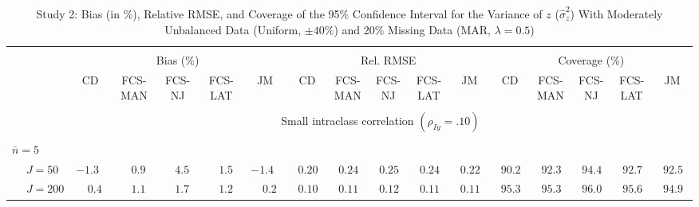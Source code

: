 \begin{sidewaystable}
\begin{threeparttable}
\setlength{\tabcolsep}{1.0pt}
\renewcommand{\arraystretch}{0.95}
\footnotesize
\caption{\small Study 2: Bias (in \%), Relative RMSE, and Coverage of the 95\% Confidence Interval for the Variance of $z$ ($\hat\sigma_z^2$) With Moderately Unbalanced Data (Uniform, $\pm 40\%$) and 20\% Missing Data (MAR, $\lambda=0.5$)}
\begin{tabular}{llccccccccccccccc}
\hline\\[-1.8ex]
& & \multicolumn{5}{c}{Bias (\%)} & \multicolumn{5}{c}{Rel. RMSE} & \multicolumn{5}{c}{Coverage (\%)} \\ \cmidrule(r){3-7}\cmidrule(r){8-12}\cmidrule(r){13-17}
 &  & CD & \makecell{FCS-\\MAN} & \makecell{FCS-\\NJ} & \makecell{FCS-\\LAT} & JM & CD & \makecell{FCS-\\MAN} & \makecell{FCS-\\NJ} & \makecell{FCS-\\LAT} & JM & CD & \makecell{FCS-\\MAN} & \makecell{FCS-\\NJ} & \makecell{FCS-\\LAT} & \multicolumn{1}{c}{JM} \\ 
[0.4ex]\hline\\[-1.8ex]
& & \multicolumn{15}{c}{Small intraclass correlation $(\rho_{Iy}=.10)$} \\[0.6ex]\hline\\[-1.8ex]
\multicolumn{4}{l}{$\bar{n}=5$} \\  & \nopagebreak $\;J=50$  & ${-}1.3\phantom{0}$ & $\phantom{-}0.9\phantom{0}$ & $\phantom{-}4.5\phantom{0}$ & $\phantom{-}1.5\phantom{0}$ & ${-}1.4\phantom{0}$ & $\phantom{0}0.20\phantom{0}$ & $\phantom{0}0.24\phantom{0}$ & $\phantom{0}0.25\phantom{0}$ & $\phantom{0}0.24\phantom{0}$ & $\phantom{0}0.22\phantom{0}$ & $\phantom{0}90.2\phantom{0}$ & $\phantom{0}92.3\phantom{0}$ & $\phantom{0}94.4\phantom{0}$ & $\phantom{0}92.7\phantom{0}$ & $\phantom{0}92.5\phantom{0}$ \\
 & \nopagebreak $\;J=200$  & $\phantom{-}0.4\phantom{0}$ & $\phantom{-}1.1\phantom{0}$ & $\phantom{-}1.7\phantom{0}$ & $\phantom{-}1.2\phantom{0}$ & $\phantom{-}0.2\phantom{0}$ & $\phantom{0}0.10\phantom{0}$ & $\phantom{0}0.11\phantom{0}$ & $\phantom{0}0.12\phantom{0}$ & $\phantom{0}0.11\phantom{0}$ & $\phantom{0}0.11\phantom{0}$ & $\phantom{0}95.3\phantom{0}$ & $\phantom{0}95.3\phantom{0}$ & $\phantom{0}96.0\phantom{0}$ & $\phantom{0}95.6\phantom{0}$ & $\phantom{0}94.9\phantom{0}$ \\

\end{tabular}
\end{threeparttable}
\end{sidewaystable}
